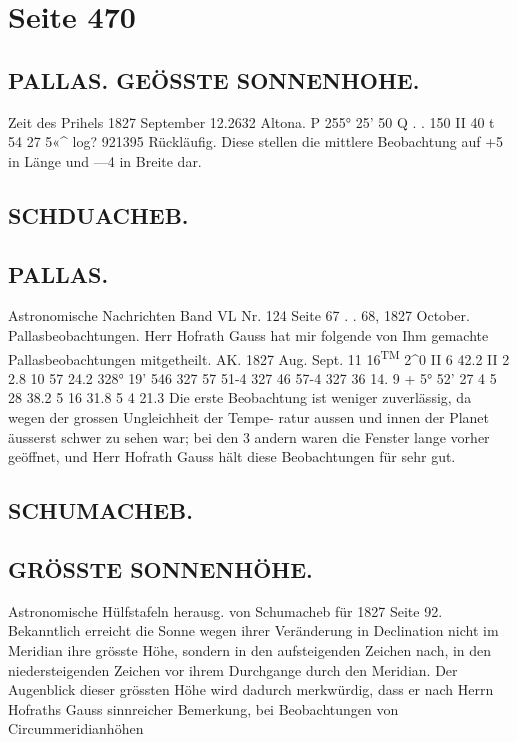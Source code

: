 \documentclass[10pt,a4paper]{article}
\begin{document}
\newpage
\section*{Seite 470}

\subsection*{PALLAS.     GEÖSSTE  SONNENHOHE.}

Zeit  des  Prihels  1827  September  12.2632  Altona.
P    255°  25'    50\glqq{}
Q    .     .     \textbullet{}\textbullet{}    150    II     40
t
54     27     5«\textasciicircum{}
log?    921395
Rückläufig.
Diese  stellen  die  mittlere  Beobachtung  auf  +5\glqq{}  in  Länge  und  ---4\glqq{}  in  Breite  dar.
\subsection*{SCHDUACHEB.}

\subsection*{PALLAS.}

Astronomische  Nachrichten  Band  VL  Nr.  124  Seite  67  .  .  68,     1827  October.
Pallasbeobachtungen.
Herr  Hofrath  Gauss  hat  mir  folgende  von  Ihm  gemachte  Pallasbeobachtungen  mitgetheilt.
AK.
1827  Aug.
Sept.
11\glqq{}  16\textsuperscript{TM}  2\textasciicircum{}0
II   6  42.2
II   2   2.8
10  57  24.2
328°  19'  54\glqq{}6
327  57  51-4
327  46  57-4
327  36  14. 9
+  5°  52'  27 \glqq{}4
5  28  38.2
5  16  31.8
5   4  21.3
Die  erste  Beobachtung  ist  weniger  zuverlässig,  da  wegen  der  grossen  Ungleichheit  der  Tempe-
ratur aussen  und  innen  der  Planet  äusserst  schwer  zu  sehen  war;  bei  den  3  andern  waren  die  Fenster
lange  vorher  geöffnet,  und  Herr  Hofrath  Gauss  hält  diese  Beobachtungen  für  sehr  gut.
\subsection*{SCHUMACHEB.}

\subsection*{GRÖSSTE  SONNENHÖHE.}

Astronomische  Hülfstafeln  herausg.  von  Schumacheb  für  1827   Seite  92.
Bekanntlich  erreicht  die  Sonne  wegen  ihrer  Veränderung  in  Declination  nicht  im  Meridian  ihre
grösste  Höhe,  sondern  in  den  aufsteigenden  Zeichen  nach,  in  den  niedersteigenden  Zeichen  vor  ihrem
Durchgange  durch  den  Meridian.  Der  Augenblick  dieser  grössten  Höhe  wird  dadurch  merkwürdig,  dass
er  nach  Herrn  Hofraths  Gauss   sinnreicher  Bemerkung,    bei  Beobachtungen  von   Circummeridianhöhen
\end{document}
